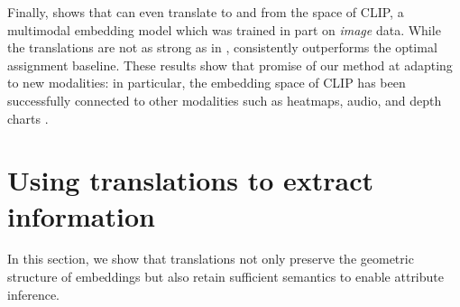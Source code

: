 Finally,  shows that \atk{} can even translate to and from the space of CLIP, a multimodal embedding model which was trained in part on \emph{image} data.  While the translations are not as strong as in , \atk{} consistently outperforms the optimal assignment baseline. These results show that promise of our method at adapting to new modalities: in particular, the embedding space of CLIP has been successfully connected to other modalities such as heatmaps, audio, and depth charts \citep{girdhar2023imagebind}.







\section{Using \atk{} translations to extract information}
\label{sec:eval_semantics}

In this section, we show that \atk{} translations not only preserve the geometric structure of embeddings but also retain sufficient semantics to enable attribute inference.




